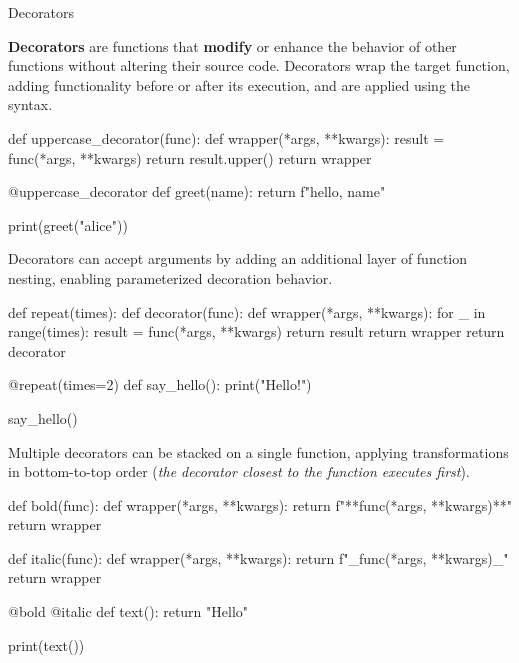 \documentclass[10pt]{article}
\begin{document}
  \begin{core}{Decorators}

    \textbf{Decorators} are functions that \textbf{modify} or enhance the behavior of other functions without altering their source code. Decorators wrap the target function, adding functionality before or after its execution, and are applied using the  syntax.

    \begin{pyconsole}

      def uppercase_decorator(func):
          def wrapper(*args, **kwargs):
              result = func(*args, **kwargs)
              return result.upper()
          return wrapper
      
      @uppercase_decorator
      def greet(name):
          return f"hello, {name}"
      
      print(greet("alice"))

    \end{pyconsole}
    
    Decorators can accept arguments by adding an additional layer of function nesting, enabling parameterized decoration behavior.

    \begin{pyconsole}

      def repeat(times):
          def decorator(func):
              def wrapper(*args, **kwargs):
                  for _ in range(times):
                      result = func(*args, **kwargs)
                  return result
              return wrapper
          return decorator
      
      @repeat(times=2)
      def say_hello():
          print("Hello!")
      
      say_hello()

    \end{pyconsole}
    
    Multiple decorators can be stacked on a single function, applying transformations in bottom-to-top order (\textit{the decorator closest to the function executes first}).

    \begin{pyconsole}

      def bold(func):
          def wrapper(*args, **kwargs):
              return f"**{func(*args, **kwargs)}**"
          return wrapper
      
      def italic(func):
          def wrapper(*args, **kwargs):
              return f"_{func(*args, **kwargs)}_"
          return wrapper
      
      @bold
      @italic
      def text():
          return "Hello"
      
      print(text())

    \end{pyconsole}

  \end{core}
\end{document}
